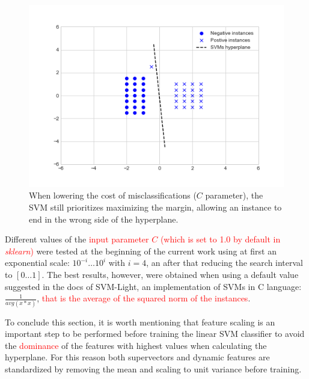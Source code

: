 \begin{figure}[H]
  \centering
  \includegraphics[width=.55\linewidth]{files/figures/method/soft_margin_low_c}
  \caption{When lowering the cost of misclassifications ($C$ parameter), the SVM still
  prioritizes maximizing the margin, allowing an instance to end in the wrong side
  of the hyperplane.}
  \label{fig:soft_margin_low_c}
\end{figure}

Different values of the \textcolor{red}{input parameter $C$ (which is set to 1.0 by default
in \textit{sklearn})}
were tested at the beginning of the
current work using at first an exponential scale:
$10^{-i} \ldots 10^{i}$ with $i=4$, an after that reducing the search interval to
$[0 \ldots 1]$. The best results, however, were obtained when using a default value
suggested in the docs of SVM-Light, an implementation of SVMs in C language: $\frac{1}{avg(x*x)}$,
\textcolor{red}{that is the average of the squared norm of the instances}.

To conclude this section, it is worth mentioning that feature scaling is an important
step to be performed before training
the linear SVM classifier to avoid the \textcolor{red}{dominance} of the
features with highest values
when calculating the hyperplane. For this reason both supervectors
and dynamic features are standardized by removing the mean and scaling to unit variance
before training.





